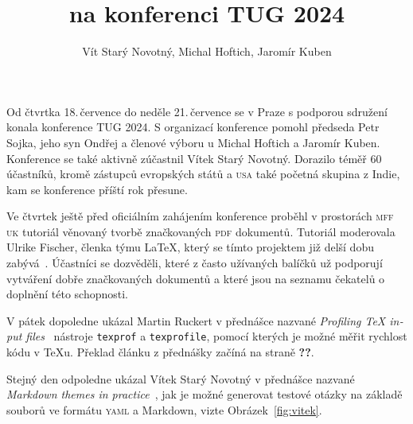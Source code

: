 \documentclass{csbulletin}
\newcommand\acro[1]{\textsc{\MakeLowercase{#1}}}
\def\strankasclankem#1#2{\textbf{??}}
\begin{document}

\title{\CSTUG{} na konferenci TUG 2024}
\author{Vít Starý Novotný, Michal Hoftich, Jaromír Kuben}
\maketitle

Od čtvrtka 18.\,července do neděle 21.\,července se v Praze s podporou sdružení \CSTUG{} konala konference TUG 2024. S organizací konference pomohl předseda Petr Sojka, jeho syn Ondřej a členové výboru \CSTUG u Michal Hoftich a Jaromír Kuben. Konference se také aktivně zúčastnil Vítek Starý Novotný. Dorazilo téměř 60 účastníků, kromě zástupců evropských států a \acro{USA} také početná skupina z Indie, kam se konference příští rok přesune.
\medskip

Ve čtvrtek ještě před oficiálním zahájením konference proběhl v prostorách \acro{MFF UK} tutoriál věnovaný tvorbě značkovaných \acro{PDF} dokumentů.
Tutoriál moderovala Ulrike Fischer, členka týmu \LaTeX, který se tímto projektem již delší dobu zabývá~\cite{mittelbach2022latex}. Účastníci se dozvěděli, které z často užívaných balíčků už podporují vytváření dobře značkovaných dokumentů a které jsou na seznamu čekatelů o doplnění této schopnosti.

V pátek dopoledne ukázal Martin Ruckert v přednášce nazvané \emph{\foreignlanguage{english}{Profiling \TeX{} input files}}~\cite{ruckert2024profiling} nástroje \texttt{texprof} a \texttt{texprofile}, pomocí kterých je možné měřit rychlost kódu v \TeX u. Překlad článku z přednášky začíná na straně \strankasclankem{Ruckert-profiling}{ruckert-profiling}.

Stejný den odpoledne ukázal Vítek Starý Novotný v přednášce nazvané \emph{\foreignlanguage{english}{Markdown themes in practice}}~\cite{starynovotny2024markdowna, starynovotny2024markdownc}, jak je možné generovat testové otázky na základě souborů ve formátu \acro{YAML} a Markdown, vizte Obrázek~\ref{fig:vitek}.
\end{document}
